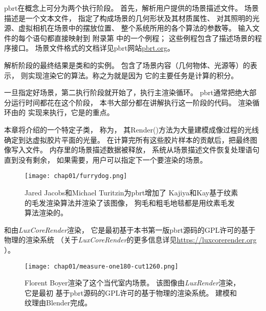 pbrt在概念上可分为两个执行阶段。
首先，解析用户提供的场景描述文件。
场景描述是一个文本文件，
指定了构成场景的几何形状及其材质属性、
对其照明的光源、虚拟相机在场景中的摆放位置、
整个系统所用的各个算法的参数等。
输入文件的每个语句都直接映射到
附录第
中的一个例程；
这些例程包含了描述场景的程序接口。
场景文件格式的文档详见pbrt网站\href{https://pbrt.org/}{\ttfamily pbrt.org}。

解析阶段的最终结果是类和的实例。
包含了场景内容（几何物体、光源等）的表示，
则实现渲染它的算法。称之为就是因为
它的主要任务是计算的积分。

一旦指定好场景，第二执行阶段就开始了，执行主渲染循环。
pbrt通常把绝大部分运行时间都花在这个阶段，
本书大部分都在讲解执行这一阶段的代码。
渲染循环由的
实现来执行，它是的重点。

本章将介绍的一个特定子类，
称为，
其{\ttfamily Render()}方法为大量建模成像过程的光线
确定到达虚拟胶片平面的光量。
在计算完所有这些胶片样本的贡献后，把最终图像写入文件。
内存里的场景描述数据被释放，
系统从场景描述文件恢复处理语句直到没有剩余，
如果需要，用户可以指定下一个要渲染的场景。

\begin{figure}[htbp]
    \centering\texttt{[image: chap01/furrydog.png]}
    \caption{Jared Jacobs和Michael Turitzin为pbrt增加了
        Kajiya和Kay基于纹素的毛发渲染算法\parencite*{10.1145/74333.74361}并渲染了该图像，
        狗毛和粗毛地毯都是用纹素毛发算法渲染的。}
    \label{fig:1.14}
\end{figure}

和由\emph{LuxCoreRender}渲染，
它是最初基于本书第一版pbrt源码的GPL许可的基于物理的渲染系统
（关于\emph{LuxCoreRender}的更多信息详见\url{https://luxcorerender.org}
）。

\begin{figure}[htbp]
    \centering\texttt{[image: chap01/measure-one180-cut1260.png]}
    \caption{Florent Boyer渲染了这个当代室内场景。
        该图像由\emph{LuxRender}渲染，它是最初
        基于pbrt源码的GPL许可的基于物理的渲染系统。
        建模和纹理由Blender完成。}
    \label{fig:1.15}
\end{figure}

